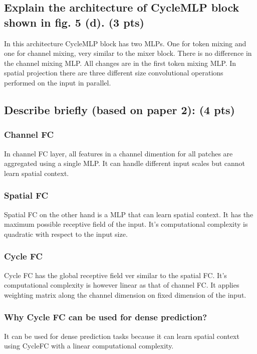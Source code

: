 \documentclass{article}
\begin{document}
\subsection{Explain the architecture of CycleMLP block shown in fig. 5 (d). (3 pts)}

In this architecture CycleMLP block has two MLPs. One for token mixing and one for channel mixing, very similar to the mixer block. There is no difference in the channel mixing MLP. All changes are in the first token mixing MLP. In spatial projection there are three different size convolutional operations performed on the input in parallel.

\subsection{Describe briefly (based on paper 2): (4 pts)}
\subsubsection{Channel FC}

In channel FC layer, all features in a channel dimention for all patches are aggregated using a single MLP. It can handle different input scales but cannot learn spatial context.

\subsubsection{Spatial FC}

Spatial FC on the other hand is a MLP that can learn spatial context. It has the maximum possible receptive field of the input. It's computational complexity is quadratic with respect to the input size.

\subsubsection{Cycle FC}

Cycle FC has the global receptive field ver similar to the spatial FC. It's computational complexity is however linear as that of channel FC. It applies weighting matrix along the channel dimension on fixed dimension of the input.

\subsubsection{Why Cycle FC can be used for dense prediction?}

It can be  used for dense prediction tasks because it can learn spatial context  using CycleFC with a linear computational complexity.




\begin{enumerate}
\end{enumerate}
\end{document}
